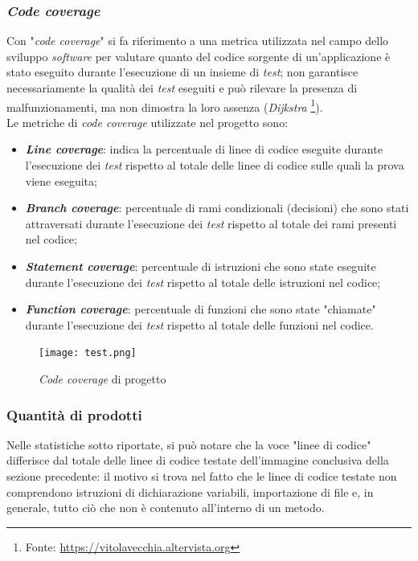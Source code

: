 \subsubsection*{\textit{Code coverage}}
Con "\textit{code coverage}" si fa riferimento a una metrica utilizzata nel campo dello sviluppo \textit{software} per valutare quanto del codice sorgente di un'applicazione è stato eseguito durante l'esecuzione di un insieme di \textit{test}; non garantisce necessariamente la qualità dei \textit{test} eseguiti 
e può rilevare la presenza di malfunzionamenti, ma non dimostra la loro assenza (\textit{Dijkstra} \footnote{Fonte: \href{https://vitolavecchia.altervista.org/tecniche-metodologie-test-software/}{https://vitolavecchia.altervista.org}}). \\
Le metriche di \textit{code coverage} utilizzate nel progetto sono:
\begin{itemize}
  \item \textit{\textbf{Line coverage}}: indica la percentuale di linee di codice eseguite durante l'esecuzione dei \textit{test} rispetto al totale delle linee di codice sulle quali la prova viene eseguita;
  \item \textit{\textbf{Branch coverage}}: percentuale di rami condizionali (decisioni) che sono stati attraversati durante l'esecuzione dei \textit{test} rispetto al totale dei rami presenti nel codice;
  \item \textit{\textbf{Statement coverage}}: percentuale di istruzioni che sono state eseguite durante l'esecuzione dei \textit{test} rispetto al totale delle istruzioni nel codice;
  \item \textit{\textbf{Function coverage}}: percentuale di funzioni che sono state "chiamate" durante l'esecuzione dei \textit{test} rispetto al totale delle funzioni nel codice.
\end{itemize}

\begin{figure}[H]
  \centering
  \texttt{[image: test.png]}
  \caption[\textit{Code coverage} di progetto]{\textit{Code coverage} di progetto}
\end{figure}

\subsubsection*{Quantità di prodotti}
Nelle statistiche sotto riportate, si può notare che la voce "linee di codice" differisce dal totale delle linee di codice testate dell'immagine conclusiva della sezione precedente: il motivo si trova nel fatto che le linee di codice testate non comprendono 
istruzioni di dichiarazione variabili, importazione di file e, in generale, tutto ciò che non è contenuto all'interno di un metodo.


